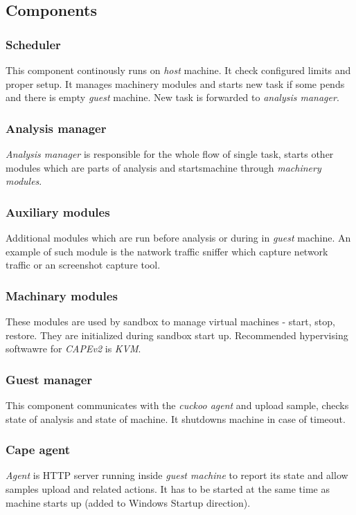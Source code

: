 \subsection{Components}
\subsubsection*{Scheduler}
This component continously runs on \emph{host} machine. It check configured limits and proper setup. It manages machinery modules and starts new task if some pends and there is empty \emph{guest} machine. New task is forwarded to \emph{analysis manager}.

\subsubsection*{Analysis manager}
\emph{Analysis manager} is responsible for the whole flow of single task, starts other modules which are parts of analysis and starts\stops machine through \emph{machinery modules}.

\subsubsection*{Auxiliary modules}
Additional modules which are run before analysis or during in \emph{guest} machine. An example of such module is the natwork traffic sniffer which capture network traffic or an screenshot capture tool.

\subsubsection*{Machinary modules}
These modules are used by sandbox to manage virtual machines - start, stop, restore. They are initialized during sandbox start up. Recommended hypervising softwawre for \emph{CAPEv2} is \emph{KVM}.

\subsubsection*{Guest manager}
This component communicates with the \emph{cuckoo agent} and upload sample, checks state of analysis and state of machine. It shutdowns machine in case of timeout.

\subsubsection*{Cape agent}
\emph{Agent} is HTTP server running inside \emph{guest machine} to report its state and allow samples upload and related actions. It has to be started at the same time as machine starts up (added to Windows Startup direction).

